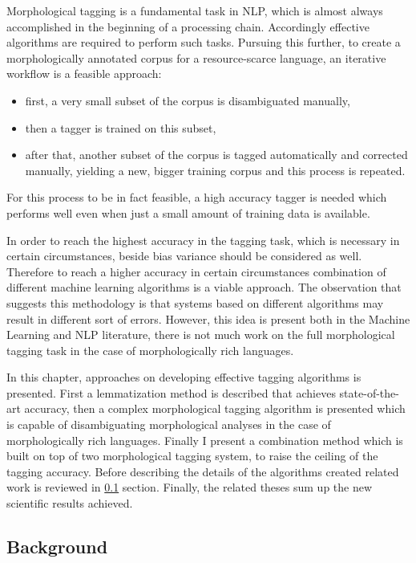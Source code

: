 Morphological tagging is a fundamental task in NLP, which is almost always accomplished in the beginning of a processing chain.
Accordingly effective algorithms are required to perform such tasks.
Pursuing this further, to create a morphologically annotated corpus for a resource-scarce language, an iterative workflow is a feasible approach:

\begin{itemize}
  \item first, a very small subset of the corpus is disambiguated manually,
  \item then a tagger is trained on this subset,
  \item after that, another subset of the corpus is tagged automatically and corrected manually, yielding a new, bigger training corpus and this process is repeated. 
\end{itemize}
For this process to be in fact feasible, a high accuracy tagger is needed which performs well even when just a small amount of training data is available. 

In order to reach the highest accuracy in the tagging task, which is necessary in certain circumstances, beside bias variance should be considered as well.
Therefore to reach a higher accuracy in certain circumstances combination of different machine learning algorithms is a viable approach.
The observation that suggests this methodology is that systems based on different algorithms may result in different sort of errors.
However, this idea is present both in the Machine Learning and NLP literature, there is not much work on the full morphological tagging task in the case of morphologically rich languages. 

In this chapter, approaches on developing effective tagging algorithms is presented.
First a lemmatization method is described that achieves state-of-the-art accuracy, then a complex morphological tagging algorithm is presented which is capable of disambiguating morphological analyses in the case of morphologically rich languages.
Finally I present a combination method which is built on top of two morphological tagging system, to raise the ceiling of the tagging accuracy.
Before describing the details of the algorithms created related work is reviewed in \ref{} section.
Finally, the related theses sum up the new scientific results achieved.

\subsection{Background   }

